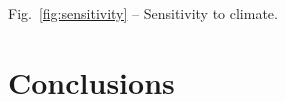 \documentclass[utf8]{article}
\begin{document}
    Fig.~\ref{fig:sensitivity} -- Sensitivity to climate.

\section{Conclusions}





%
%






\end{document}
